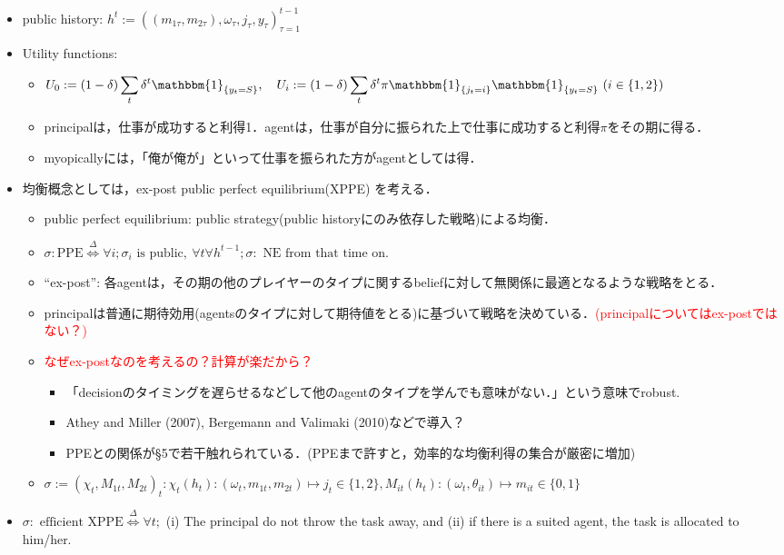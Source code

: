 \documentclass[11pt,a4paper,dvipdfmx]{article}
\newcommand{\defi}{\stackrel{\Delta}{\Longleftrightarrow}}
\newcommand{\1}{\mathbbm{1}}
\newcommand{\ocomment}[1]{{\textcolor{red}{#1}}}
\begin{document}
\begin{itemize}
	\item public history: $h^t := ((m_{1\tau}, m_{2\tau}), \omega_\tau, j_\tau, y_\tau)_{\tau=1}^{t-1}$
	\item Utility functions:
	\begin{itemize}
		\item $\displaystyle{U_0 := (1 - \delta) \sum_t \delta^t \1_{\{y_t = S\}} }, \quad 
		\displaystyle{U_i := (1 - \delta) \sum_t \delta^t  \pi \1_{\{j_t = i \}}\1_{\{y_t = S\}} \ (i \in \{1,2\})}$
		\item principalは，仕事が成功すると利得1．agentは，仕事が自分に振られた上で仕事に成功すると利得$\pi$をその期に得る．
		\item myopicallyには，「俺が俺が」といって仕事を振られた方がagentとしては得．
	\end{itemize}
	\item 均衡概念としては，ex-post public perfect equilibrium(XPPE) を考える．
	\begin{itemize}
		\item public perfect equilibrium: public strategy(public historyにのみ依存した戦略)による均衡．
		\item $\sigma: \text{PPE} \defi \forall i; \sigma_i \text{ is public}, \ \forall t \forall h^{t-1}; \sigma: \text{ NE from that time on.}$
		\item ``ex-post'': 各agentは，その期の他のプレイヤーのタイプに関するbeliefに対して無関係に最適となるような戦略をとる．
		\item principalは普通に期待効用(agentsのタイプに対して期待値をとる)に基づいて戦略を決めている．\ocomment{(principalについてはex-postではない？)}
		\item \ocomment{なぜex-postなのを考えるの？計算が楽だから？}
		\begin{itemize}
			\item 「decisionのタイミングを遅らせるなどして他のagentのタイプを学んでも意味がない．」という意味でrobust.
			\item Athey and Miller (2007), Bergemann and Valimaki (2010)などで導入？
			\item PPEとの関係が\S5で若干触れられている．(PPEまで許すと，効率的な均衡利得の集合が厳密に増加)
		\end{itemize}
		\item $\sigma := (\chi_t, M_{1t}, M_{2t})_t: \chi_t(h_t): (\omega_t, m_{1t}, m_{2t}) \mapsto j_t \in \{1,2\}, M_{it}(h_t): (\omega_t, \theta_{it}) \mapsto m_{it} \in \{0,1\}$
	\end{itemize}
	\item $\sigma: \text{ efficient XPPE} \defi \forall t;$ (i) The principal do not throw the task away, and (ii) if there is a suited agent, the task is allocated to him/her. 
\end{itemize}
\end{document}
